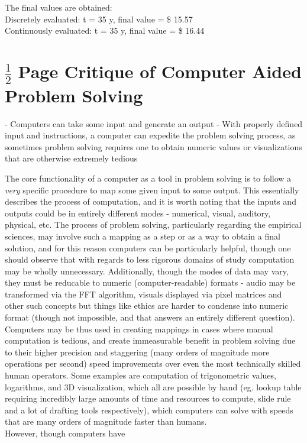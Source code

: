 \documentclass[10pt]{report}
\begin{document}
    The final values are obtained:\\
    Discretely evaluated: t  = 35 y, final value = \$ 15.57\\
    Continuously evaluated: t = 35 y, final value = \$ 16.44
    
    \section*{$\frac{1}{2}$ Page Critique of Computer Aided Problem Solving}

    - Computers can take some input and generate an output
    - With properly defined input and instructions, a computer can expedite the problem solving process, as sometimes problem solving requires one to obtain numeric values or visualizations that are otherwise extremely tedious
    
    The core functionality of a computer as a tool in problem solving is to follow a \textit{very} specific procedure to map some given input to some output. This essentially describes the process of computation, and it is worth noting that the inputs and outputs could be in entirely different modes - numerical, visual, auditory, physical, etc. The process of problem solving, particularly regarding the empirical sciences, may involve such a mapping as a step or as a way to obtain a final solution, and for this reason computers can be particularly helpful, though one should observe that with regards to less rigorous domains of study computation may be wholly unnecessary. Additionally, though the modes of data may vary, they must be reducable to numeric (computer-readable) formats - audio may be transformed via the FFT algorithm, visuals displayed via pixel matrices and other such concepts but things like ethics are harder to condense into numeric format (though not impossible, and that answers an entirely different question). \\Computers may be thus used in creating mappings in cases where manual computation is tedious, and create immeasurable benefit in problem solving due to their higher precision and staggering (many orders of magnitude more operations per second) speed improvements over even the most technically skilled human operators. Some examples are computation of trigonometric values, logarithms, and 3D visualization, which all are possible by hand (eg. lookup table requiring incredibly large amounts of time and resources to compute, slide rule and a lot of drafting tools respectively), which computers can solve with speeds that are many orders of magnitude faster than humans.\\However, though computers have 
\end{document}
